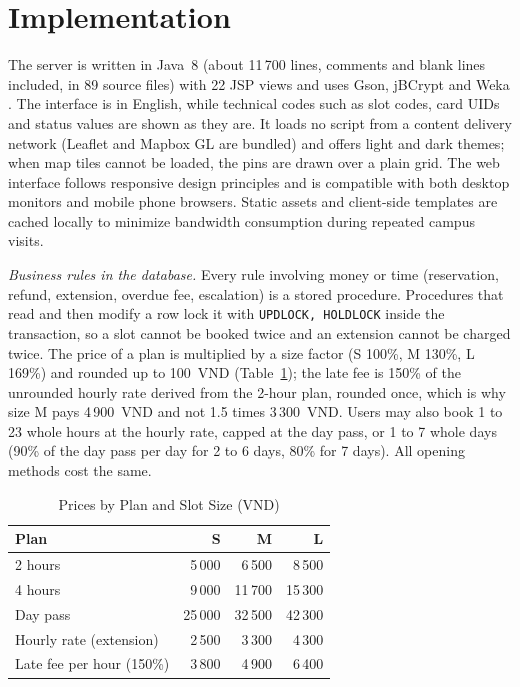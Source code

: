 \section{Implementation}
The server is written in Java~8 (about 11\,700 lines, comments and blank lines included, in 89 source files) with
22 JSP views and uses Gson, jBCrypt \cite{provos1999bcrypt} and Weka \cite{hall2009weka}. The interface is in English,
while technical codes such as slot codes, card UIDs and status values are shown as they are. It loads no script from a
content delivery network (Leaflet and Mapbox GL are bundled) and offers light and dark themes; when map tiles cannot be
loaded, the pins are drawn over a plain grid. The web interface follows responsive design principles and is compatible with
both desktop monitors and mobile phone browsers. Static assets and client-side templates are cached locally to minimize
bandwidth consumption during repeated campus visits.

\textit{Business rules in the database.} Every rule involving money or time (reservation, refund, extension,
overdue fee, escalation) is a stored procedure. Procedures that read and then modify a row lock it with
\texttt{UPDLOCK, HOLDLOCK} inside the transaction, so a slot cannot be booked twice and an extension cannot be charged
twice. The price of a plan is multiplied by a size factor (S 100\%, M 130\%, L 169\%) and rounded up to 100~VND
(Table~\ref{tab:price}); the late fee is 150\% of the unrounded hourly rate derived from the 2-hour plan, rounded once,
which is why size M pays 4\,900~VND and not 1.5 times 3\,300~VND. Users may also book 1 to 23 whole hours at the hourly
rate, capped at the day pass, or 1 to 7 whole days (90\% of the day pass per day for 2 to 6 days, 80\% for 7 days).
All opening methods cost the same.

\begin{table}[!htbp]\renewcommand{\arraystretch}{0.88}
\renewcommand{\arraystretch}{1.0}
\centering
\small
\caption{Prices by Plan and Slot Size (VND)}
\label{tab:price}
\footnotesize
\begin{tabular}{l r r r}
\hline
Plan & S & M & L \\
\hline
2 hours & 5\,000 & 6\,500 & 8\,500 \\
4 hours & 9\,000 & 11\,700 & 15\,300 \\
Day pass & 25\,000 & 32\,500 & 42\,300 \\
Hourly rate (extension) & 2\,500 & 3\,300 & 4\,300 \\
Late fee per hour (150\%) & 3\,800 & 4\,900 & 6\,400 \\
\hline
\end{tabular}
\end{table}


